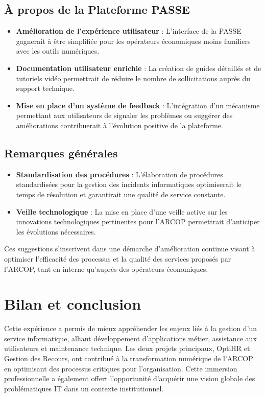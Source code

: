 \subsection{À propos de la Plateforme PASSE}

\begin{itemize}
    \item \textbf{Amélioration de l'expérience utilisateur} : L'interface de la PASSE gagnerait à être simplifiée pour les opérateurs économiques moins familiers avec les outils numériques.
    
    \item \textbf{Documentation utilisateur enrichie} : La création de guides détaillés et de tutoriels vidéo permettrait de réduire le nombre de sollicitations auprès du support technique.
    
    \item \textbf{Mise en place d'un système de feedback} : L'intégration d'un mécanisme permettant aux utilisateurs de signaler les problèmes ou suggérer des améliorations contribuerait à l'évolution positive de la plateforme.
\end{itemize}

\subsection{Remarques générales}

\begin{itemize}
    \item \textbf{Standardisation des procédures} : L'élaboration de procédures standardisées pour la gestion des incidents informatiques optimiserait le temps de résolution et garantirait une qualité de service constante.
    
    \item \textbf{Veille technologique} : La mise en place d'une veille active sur les innovations technologiques pertinentes pour l'ARCOP permettrait d'anticiper les évolutions nécessaires.
\end{itemize}

Ces suggestions s'inscrivent dans une démarche d'amélioration continue visant à optimiser l'efficacité des processus et la qualité des services proposés par l'ARCOP, tant en interne qu'auprès des opérateurs économiques.

\section{Bilan et conclusion}
Cette expérience a permis de mieux appréhender les enjeux liés à la gestion d'un service informatique, alliant développement d'applications métier, assistance aux utilisateurs et maintenance technique. Les deux projets principaux, OptiHR et Gestion des Recours, ont contribué à la transformation numérique de l'ARCOP en optimisant des processus critiques pour l'organisation. Cette immersion professionnelle a également offert l'opportunité d'acquérir une vision globale des problématiques IT dans un contexte institutionnel.

\clearpage
